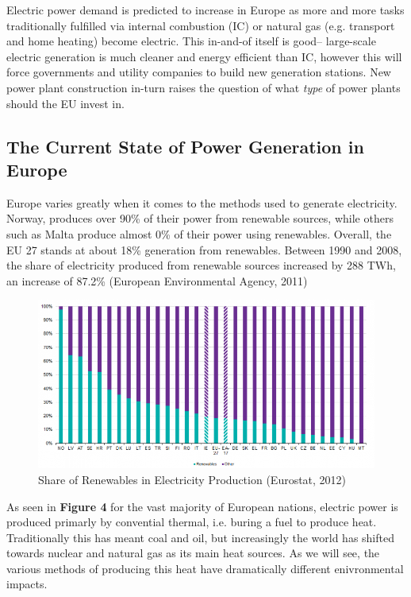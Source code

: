 \documentclass{article}
\begin{document}
Electric power demand is predicted to increase in Europe as more and more tasks traditionally fulfilled via internal combustion (IC) or natural gas (e.g. transport and home heating) become electric. This in-and-of itself is good-- large-scale electric generation is much cleaner and energy efficient than IC, however this will force governments and utility companies to build new generation stations. New power plant construction in-turn raises the question of what \emph{type} of power plants should the EU invest in. 

\subsection{The Current State of Power Generation in Europe}
Europe varies greatly when it comes to the methods used to generate electricity. Norway, produces over 90\% of their power from renewable sources, while others such as Malta produce almost 0\% of their power using renewables. Overall, the EU 27 stands at about 18\% generation from renewables. Between 1990 and 2008, the share of electricity produced from renewable sources increased by 288 TWh, an increase of 87.2\% (European Environmental Agency, 2011) 

\begin{figure}[H]
	\begin{center}
	\includegraphics[scale = .6]{Figures/percentrenew.png}
	\caption{Share of Renewables in Electricity Production (Eurostat, 2012)}
	\end{center}
\end{figure}

As seen in {\bf Figure 4} for the vast majority of European nations, electric power is produced primarly by convential thermal, i.e. buring a fuel to produce heat. Traditionally this has meant coal and oil, but increasingly the world has shifted towards nuclear and natural gas as its main heat sources. As we will see, the various methods of producing this heat have dramatically different enivronmental impacts. 
\end{document}

